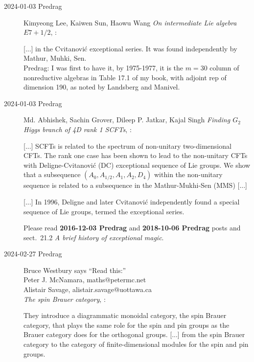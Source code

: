 \begin{description}
\item[2024-01-03 Predrag]
Kimyeong Lee, Kaiwen Sun, Haowu Wang
{\em On intermediate Lie algebra $E7+1/2$},
:

[...] in the Cvitanovi{\'c} exceptional series. It was found independently
by Mathur, Muhki, Sen.
\\
Predrag:  I was first to have it, by 1975-1977, it is the $m=30$ column of
nonreductive algebras in Table 17.1 of my book, with adjoint rep of
dimension 190, as noted by Landsberg and Manivel.

\item[2024-01-03 Predrag]
Md. Abhishek, Sachin Grover, Dileep P. Jatkar, Kajal Singh %
{\em Finding $G_2$ Higgs branch of 4D rank 1 SCFTs},
:

[...] SCFTs is related to the spectrum of non-unitary two-dimensional
CFTs. The rank one case has been shown to lead to the non-unitary CFTs
with Deligne-Cvitanovi{\'c} (DC) exceptional sequence of Lie groups. We show
that a subsequence $(A_0,A_{1/2},A_1,A_2,D_4)$ within the non-unitary sequence is
related to a subsequence in the Mathur-Mukhi-Sen (MMS) [...]

[...]
In 1996, Deligne and later Cvitanovi{\'c} independently found a special sequence
of Lie groups, termed the exceptional series.

Please read {\bf 2016-12-03 Predrag} and {\bf 2018-10-06 Predrag}
posts and
{sect.~21.2} {\em A brief history of exceptional magic}.

\item[2024-02-27 Predrag]
{Bruce Westbury} says ``Read this:''
\\
 {Peter J. McNamara}, maths@petermc.net
\\
 {Alistair Savage}, alistair.savage@uottawa.ca
\\
{\em The spin Brauer category},
:

They introduce a diagrammatic monoidal category,
the spin Brauer category, that plays the same role for the spin
and pin groups as the Brauer category does for the orthogonal groups.
[...]
from the spin Brauer category to the category of
finite-dimensional modules for the spin and pin groups.


\end{description}
